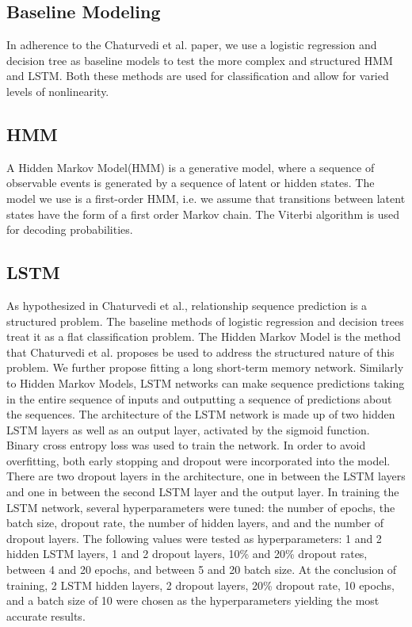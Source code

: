 \documentclass[11pt,a4paper]{article}
\begin{document}
\subsection{Baseline Modeling}
In adherence to the Chaturvedi et al. paper, we use a logistic regression and decision tree as baseline models to test the more complex and structured HMM and LSTM. Both these methods are used for classification and allow for varied levels of nonlinearity. 

\subsection{HMM}
A Hidden Markov Model(HMM) is a generative model, where a sequence of observable events is generated by a sequence of latent or hidden states. The model we use is a first-order HMM, i.e. we assume that transitions between latent states have the form of a first order Markov chain. The Viterbi algorithm is used for decoding probabilities.

\subsection{LSTM}
As hypothesized in Chaturvedi et al., relationship sequence prediction is a structured problem. The baseline methods of logistic regression and decision trees treat it as a flat classification problem. The Hidden Markov Model is the method that Chaturvedi et al. proposes be used to address the structured nature of this problem. We further propose fitting a long short-term memory network. Similarly to Hidden Markov Models, LSTM networks can make sequence predictions taking in the entire sequence of inputs and outputting a sequence of predictions about the sequences. 
The architecture of the LSTM network is made up of two hidden LSTM layers as well as an output layer, activated by the sigmoid function. Binary cross entropy loss was used to train the network. In order to avoid overfitting, both early stopping and dropout were incorporated into the model. There are two dropout layers in the architecture, one in between the LSTM layers and one in between the second LSTM layer and the output layer.
In training the LSTM network, several hyperparameters were tuned: the number of epochs, the batch size, dropout rate, the number of hidden layers, and and the number of dropout layers. The following values were tested as hyperparameters: 1 and 2 hidden LSTM layers, 1 and 2 dropout layers, 10\% and 20\% dropout rates, between 4 and 20 epochs, and between 5 and 20 batch size. At the conclusion of training, 2 LSTM hidden layers, 2 dropout layers, 20\% dropout rate, 10 epochs, and a batch size of 10 were chosen as the hyperparameters yielding the most accurate results.
\end{document}
